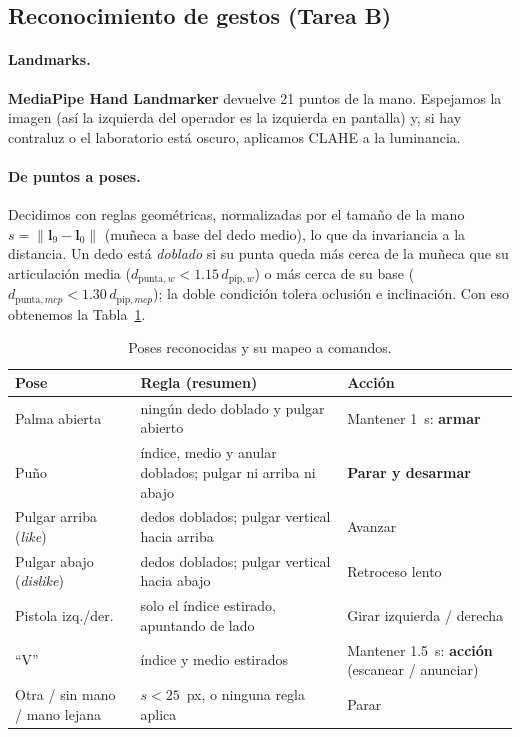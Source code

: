 \documentclass[11pt,a4paper]{article}
\begin{document}
\subsection{Reconocimiento de gestos (Tarea B)}
\label{sec:gestos}
\paragraph{Landmarks.} \textbf{MediaPipe Hand Landmarker} devuelve 21 puntos de la mano. Espejamos la imagen (as\'i la izquierda del operador es la izquierda en
pantalla) y, si hay contraluz o el laboratorio est\'a oscuro, aplicamos CLAHE a la luminancia.

\paragraph{De puntos a poses.} Decidimos con reglas geom\'etricas, normalizadas por el tama\~no de la mano $s=\lVert \mathbf{l}_9-\mathbf{l}_0\rVert$ (mu\~neca
a base del dedo medio), lo que da invariancia a la distancia. Un dedo est\'a \emph{doblado} si su punta queda m\'as cerca de la mu\~neca que su articulaci\'on
media ($d_{\text{punta},w}<1.15\,d_{\text{pip},w}$) o m\'as cerca de su base ($d_{\text{punta},mcp}<1.30\,d_{\text{pip},mcp}$); la doble condici\'on tolera
oclusi\'on e inclinaci\'on. Con eso obtenemos la Tabla~\ref{tab:poses}.

\begin{table}[H]
\centering\small
\begin{tabularx}{\textwidth}{@{}l>{\raggedright\arraybackslash}X>{\raggedright\arraybackslash}X@{}}
\toprule
\textbf{Pose} & \textbf{Regla (resumen)} & \textbf{Acci\'on} \\
\midrule
Palma abierta & ning\'un dedo doblado y pulgar abierto & Mantener 1~s: \textbf{armar} \\
Pu\~no & \'indice, medio y anular doblados; pulgar ni arriba ni abajo & \textbf{Parar y desarmar} \\
Pulgar arriba (\emph{like}) & dedos doblados; pulgar vertical hacia arriba & Avanzar \\
Pulgar abajo (\emph{dislike}) & dedos doblados; pulgar vertical hacia abajo & Retroceso lento \\
Pistola izq./der. & solo el \'indice estirado, apuntando de lado & Girar izquierda / derecha \\
``V'' & \'indice y medio estirados & Mantener 1.5~s: \textbf{acci\'on} (escanear / anunciar) \\
Otra / sin mano / mano lejana & $s<25$~px, o ninguna regla aplica & Parar \\
\bottomrule
\end{tabularx}
\caption{Poses reconocidas y su mapeo a comandos.}
\label{tab:poses}
\end{table}
\end{document}
